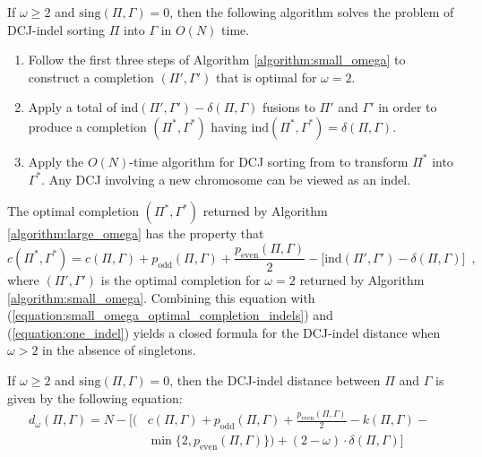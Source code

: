 \begin{algorithm}
If $\omega \geq 2$ and $\mathrm{sing}(\Pi, \Gamma) = 0$, then the following algorithm solves the problem of DCJ-indel sorting $\Pi$ into $\Gamma$ in $O(N)$ time.
\begin{enumerate}
\item Follow the first three steps of Algorithm \ref{algorithm:small_omega} to construct a completion $(\Pi', \Gamma')$ that is optimal for $\omega = 2$.
\item Apply a total of $\mathrm{ind}(\Pi', \Gamma') - \delta(\Pi, \Gamma)$ fusions to $\Pi'$ and $\Gamma'$ in order to produce a completion $(\Pi^{*}, \Gamma^{*})$ having $\mathrm{ind}(\Pi^{*}, \Gamma^{*}) = \delta(\Pi, \Gamma)$.
\item Apply the $O(N)$-time algorithm for DCJ sorting from \cite{yancopoulos} to transform $\Pi^{*}$ into $\Gamma^{*}$.  Any DCJ involving a new chromosome can be viewed as an indel.
\end{enumerate}
\label{algorithm:large_omega}
\end{algorithm}

\noindent The optimal completion $(\Pi^{*}, \Gamma^{*})$ returned by Algorithm \ref{algorithm:large_omega} has the property that
\begin{equation}
c(\Pi^{*}, \Gamma^{*}) = c(\Pi, \Gamma) + p_{\mathrm{odd}}(\Pi, \Gamma) + \dfrac{p_{\mathrm{even}}(\Pi, \Gamma)}{2} - \Big[\mathrm{ind}(\Pi', \Gamma') - \delta(\Pi, \Gamma)\Big]\enspace,
\label{equation:optimal_completion_large_omega}
\end{equation}
\noindent where $(\Pi', \Gamma')$ is the optimal completion for $\omega = 2$ returned by Algorithm \ref{algorithm:small_omega}.  Combining this equation with (\ref{equation:small_omega_optimal_completion_indels}) and (\ref{equation:one_indel}) yields a closed formula for the DCJ-indel distance when $\omega > 2$ in the absence of singletons.

\begin{corollary}
If $\omega \geq 2$ and $\mathrm{sing}(\Pi, \Gamma) = 0$, then the DCJ-indel distance between $\Pi$ and $\Gamma$ is given by the following equation:
\begin{equation}
\begin{split}
d_{\omega}(\Pi, \Gamma) = N -  \bigg[ \Big( & c(\Pi, \Gamma) + p_{\mathrm{odd}}(\Pi, \Gamma) + \frac{p_{\mathrm{even}}(\Pi, \Gamma)}{2} - k(\Pi, \Gamma) - \phantom{x} \\
& \min{\big\{2, p_{\mathrm{even}}(\Pi, \Gamma)\big\}}\Big) +  (2 - \omega) \cdot \delta(\Pi, \Gamma)\bigg]
\end{split}
\label{equation:large_omega_distance}
\end{equation}
\label{corollary:large_omega_distance}
\end{corollary}
\vspace{-\baselineskip}

